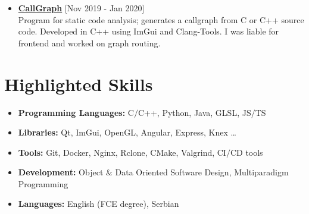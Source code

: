 \documentclass[a4paper]{moderncv}
\begin{document}
\begin{itemize}
			\item \textbf{\href{https://github.com/djordjetane/CallGraph}{CallGraph}} \hfill[Nov 2019 - Jan 2020]\\
			Program for static code analysis; generates a callgraph from C or C++ source code. Developed in C++ using 
			ImGui and Clang-Tools. I was liable for frontend and worked on graph routing.

		\end{itemize}

\section{Highlighted Skills}

	\begin{itemize}
		
		\item \textbf{Programming Languages: } C$\slash$C++, Python, Java, GLSL, JS$\slash$TS
		\item \textbf{Libraries: } Qt, ImGui, OpenGL, Angular, Express, Knex \dots
		\item \textbf{Tools: } Git, Docker, Nginx, Rclone, CMake, Valgrind, CI$\slash$CD tools
		\item \textbf{Development: } Object \& Data Oriented Software Design, Multiparadigm Programming
		\item \textbf{Languages: } English (FCE degree), Serbian
		
	\end{itemize}
%
%
\end{document}
